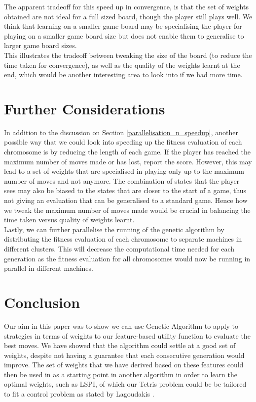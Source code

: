 \documentclass[a4paper,12pt,twocolumn]{article}
\begin{document}
The apparent tradeoff for this speed up in convergence, is that the set of weights
obtained are not ideal for a full sized board, though the player still plays well.
We think that learning on a smaller game board may be specialising the player for playing on
a smaller game board size but does not enable them to generalise to larger game board sizes.\\

This illustrates the tradeoff between tweaking the size of the board (to
reduce the time taken for convergence), as well as the quality of the weights
learnt at the end, which would be another interesting area to look into if we had
more time.

\section{Further Considerations}

In addition to the discussion on Section \ref{parallelisation_n_speedup},
another possible way that we could look into speeding up the fitness evaluation
of each chromosome is by reducing the length of each game. If the player has reached
the maximum number of moves made or has lost, report the score. However, this may
lead to a set of weights that are specialised in playing only up to the maximum
number of moves and not anymore. The combination of states that the player sees may
also be biased to the states that are closer to the start of a game, thus not
giving an evaluation that can be generalised to a standard game. Hence how we
tweak the maximum number of moves made would be crucial in balancing the
time taken versus quality of weights learnt.\\

Lastly, we can further parallelise the running of the genetic algorithm by distributing
the fitness evaluation of each chromosome to separate machines in different
clusters. This will decrease the computational time needed for each generation as the
fitness evaluation for all chromosomes would now be running in parallel in different
machines.

\section{Conclusion}
Our aim in this paper was to show we can use Genetic Algorithm to apply to strategies
in terms of weights to our feature-based utility function to evaluate the best moves.
We have showed that the algorithm could settle at a good set of weights, despite
not having a guarantee that each consecutive generation would improve. The set of weights
that we have derived based on these features could then be used in as a starting point
in another algorithm in order to learn the optimal weights, such as LSPI, of which our
Tetris problem could be be tailored to fit a control problem as stated by Lagoudakis \cite{lagoudakis}.\\
\end{document}
